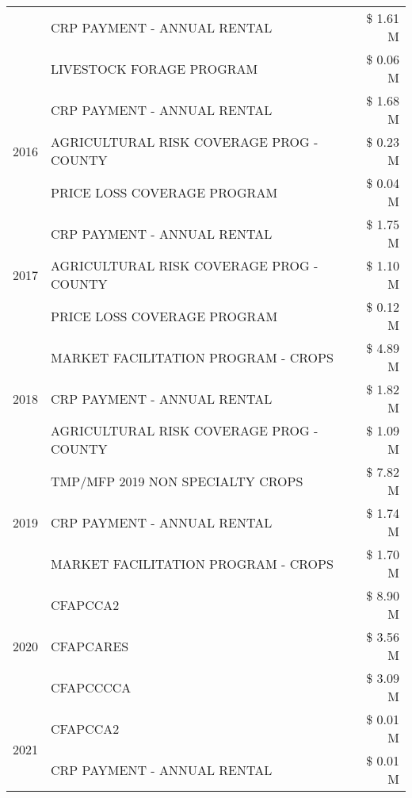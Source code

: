 \begin{tabular}{llr}
 & CRP PAYMENT - ANNUAL RENTAL & \$ 1.61 M \\
 & LIVESTOCK FORAGE PROGRAM & \$ 0.06 M \\
\cline{1-3}
\multirow[t]{3}{*}{2016} & CRP PAYMENT - ANNUAL RENTAL & \$ 1.68 M \\
 & AGRICULTURAL RISK COVERAGE PROG - COUNTY & \$ 0.23 M \\
 & PRICE LOSS COVERAGE PROGRAM & \$ 0.04 M \\
\cline{1-3}
\multirow[t]{3}{*}{2017} & CRP PAYMENT - ANNUAL RENTAL & \$ 1.75 M \\
 & AGRICULTURAL RISK COVERAGE PROG - COUNTY & \$ 1.10 M \\
 & PRICE LOSS COVERAGE PROGRAM & \$ 0.12 M \\
\cline{1-3}
\multirow[t]{3}{*}{2018} & MARKET FACILITATION PROGRAM - CROPS & \$ 4.89 M \\
 & CRP PAYMENT - ANNUAL RENTAL & \$ 1.82 M \\
 & AGRICULTURAL RISK COVERAGE PROG - COUNTY & \$ 1.09 M \\
\cline{1-3}
\multirow[t]{3}{*}{2019} & TMP/MFP 2019 NON SPECIALTY CROPS & \$ 7.82 M \\
 & CRP PAYMENT - ANNUAL RENTAL & \$ 1.74 M \\
 & MARKET FACILITATION PROGRAM - CROPS & \$ 1.70 M \\
\cline{1-3}
\multirow[t]{3}{*}{2020} & CFAPCCA2 & \$ 8.90 M \\
 & CFAPCARES & \$ 3.56 M \\
 & CFAPCCCCA & \$ 3.09 M \\
\cline{1-3}
\multirow[t]{2}{*}{2021} & CFAPCCA2 & \$ 0.01 M \\
 & CRP PAYMENT - ANNUAL RENTAL & \$ 0.01 M \\
\cline{1-3}
\bottomrule
\end{tabular}
